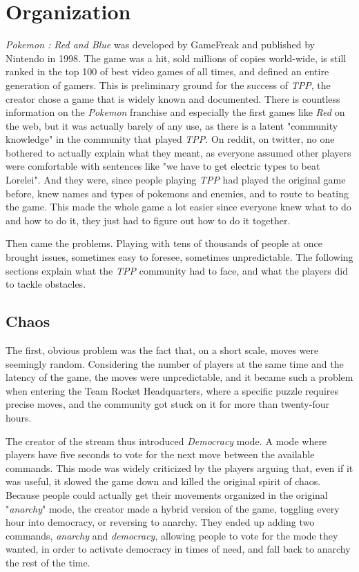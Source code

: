 \documentclass[a4paper]{article}
\begin{document}
\newpage

\section{Organization}

\textit{Pokemon : Red and Blue} was developed by GameFreak and published by Nintendo in 1998. The game was a hit, sold millions of copies world-wide, is still ranked in the top 100 of best video games of all times, and defined an entire generation of gamers. This is preliminary ground for the success of \textit{TPP}, the creator chose a game that is widely known and documented. There is countless information on the \textit{Pokemon} franchise and especially the first games like \textit{Red} on the web, but it was actually barely of any use, as there is a latent "community knowledge" in the community that played \textit{TPP}. On reddit, on twitter, no one bothered to actually explain what they meant, as everyone assumed other players were comfortable with sentences like "we have to get electric types to beat Lorelei". And they were, since people playing \textit{TPP} had played the original game before, knew names and types of pokemons and enemies, and to route to beating the game. This made the whole game a lot easier since everyone knew what to do and how to do it, they just had to figure out how to do it together.

Then came the problems. Playing with tens of thousands of people at once brought issues, sometimes easy to foresee, sometimes unpredictable. The following sections explain what the \textit{TPP} community had to face, and what the players did to tackle obstacles.

\subsection{Chaos}

The first, obvious problem was the fact that, on a short scale, moves were seemingly random. Considering the number of players at the same time and the latency of the game, the moves were unpredictable, and it became such a problem when entering the Team Rocket Headquarters, where a specific puzzle requires precise moves, and the community got stuck on it for more than twenty-four hours.

The creator of the stream thus introduced \textit{Democracy} mode. A mode where players have five seconds to vote for the next move between the available commands. This mode was widely criticized by the players arguing that, even if it was useful, it slowed the game down and killed the original spirit of chaos. Because people could actually get their movements organized in the original "\textit{anarchy}" mode, the creator made a hybrid version of the game, toggling every hour into democracy, or reversing to anarchy. They ended up adding two commands, \textit{anarchy} and \textit{democracy}, allowing people to vote for the mode they wanted, in order to activate democracy in times of need, and fall back to anarchy the rest of the time.
\end{document}
